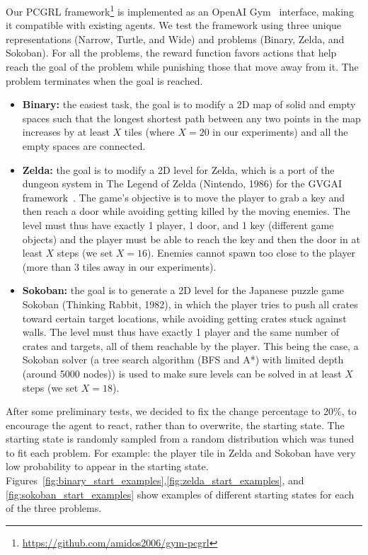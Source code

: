\documentclass[letterpaper]{article} %
\begin{document}
Our PCGRL framework\footnote{\url{https://github.com/amidos2006/gym-pcgrl}} is implemented as an OpenAI Gym~\cite{brockman2016openai} interface, making it compatible with existing agents. We test the framework using three unique representations (Narrow, Turtle, and Wide) and problems (Binary, Zelda, and Sokoban). For all the problems, the reward function favors actions that help reach the goal of the problem while punishing those that move away from it. The problem terminates when the goal is reached. 
\begin{itemize}
    \item \textbf{Binary:} the easiest task, the goal is to modify a 2D map of solid and empty spaces such that the longest shortest path between any two points in the map increases by at least $X$ tiles (where $X=20$ in our experiments) and all the empty spaces are connected.
    \item \textbf{Zelda:} the goal is to modify a 2D level for Zelda, which is a port of the dungeon system in The Legend of Zelda (Nintendo, 1986) for the GVGAI framework~\cite{perez2019general}. The game's objective is to move the player to grab a key and then reach a door while avoiding getting killed by the moving enemies. The level must thus have exactly 1 player, 1 door, and 1 key (different game objects) and the player must be able to reach the key and then the door in at least $X$ steps (we set $X=16$). Enemies cannot spawn too close to the player (more than $3$ tiles away in our experiments). 
    \item \textbf{Sokoban:} the goal is to generate a 2D level for the Japanese puzzle game Sokoban (Thinking Rabbit, 1982), in which the player tries to push all crates toward certain target locations, while avoiding getting crates stuck against walls. The level must thus have exactly 1 player and the same number of crates and targets, all of them reachable by the player. This being the case, a Sokoban solver (a tree search algorithm (BFS and A*) with limited depth (around 5000 nodes)) is used to make sure levels can be solved in at least $X$ steps (we set $X=18$).
\end{itemize}

After some preliminary tests, we decided to fix the change percentage to 20\%, to encourage the agent to react, rather than to overwrite, the starting state. The starting state is randomly sampled from a random distribution which was tuned to fit each problem. For example: the player tile in Zelda and Sokoban have very low probability to appear in the starting state. Figures~\ref{fig:binary_start_examples},\ref{fig:zelda_start_examples}, and \ref{fig:sokoban_start_examples} show examples of different starting states for each of the three problems.
\end{document}

